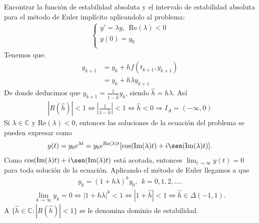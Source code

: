 \begin{ejemplo}
    Encontrar la función de estabilidad absoluta y el intervalo de estabilidad absoluta para el método de Euler implícito aplicandolo al problema:
    \begin{align*}
        \left\{ \begin{array}{lcc}
                    y' = \lambda y, \ \ \text{Re}(\lambda) < 0 \\
                    y(0) = y_0                                 \\
                \end{array}
        \right.
    \end{align*}
    Tenemos que:
    \begin{align*}
        y_{k+1} & = y_k + hf(t_{k+1},y_{k+1}) \\
                & = y_k + h\lambda y_{k+1}
    \end{align*}
    De donde deducimos que $y_{k+1} = \frac{1}{1-\hat{h}}y_k$, siendo $\hat{h} = h\lambda$. Así
    \begin{align*}
        |R(\hat{h})| < 1 \Longleftrightarrow \left| \frac{1}{1-\hat{h}} \right| < 1 \Longleftrightarrow \hat{h} < 0 \Longrightarrow I_A = (-\infty,0)
    \end{align*}
    Si $\lambda \in \mathbb{C}$ y $\text{Re}(\lambda) < 0$, entonces las soluciones de la ecuación del problema se pueden expresar como
    \begin{align*}
        y(t) = y_0 e^{\lambda t} = y_0 e^{\text{Re}(\lambda)t}[\cos(\text{Im}(\lambda)t) + i\sen(\text{Im}(\lambda)t)].
    \end{align*}
    Como $\cos(\text{Im}(\lambda)t) + i\sen(\text{Im}(\lambda)t)$ está acotada, entonces $\lim_{t \to \infty} y(t) = 0$ para toda solución de la ecuación. Aplicando el método de Euler  llegamos a que
    \begin{align*}
        y_k = (1 + h\lambda)^ky_0, \ \ k = 0,1,2,\ldots.
    \end{align*}
    \begin{align*}
        \lim_{k \to \infty} y_k = 0 \Longleftrightarrow |1+ h\lambda|^k < 1 \Longleftrightarrow |1 + \hat{h}| < 1 \Longleftrightarrow \hat{h} \in \Delta(-1,1).
    \end{align*}
    A $\{ \hat{h} \in \mathbb{C} : |R(\hat{h})| < 1\}$ se le denomina dominio de estabilidad.


\end{ejemplo}
